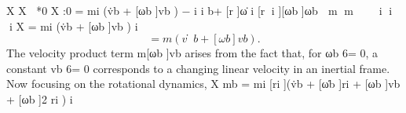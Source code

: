 \documentclass[12pt,a4paper]{article}
\begin{document}
                      X                               X        *0 X               :0
                  =         mi (v̇b + [ωb ]vb ) −          i i b+
                                                            [r ]ω̇     i [r
                                                                          i ][ωb ]ωb
                                                                                    
                                                          m          m
                                                                                
                                                                     
                        i                             i          i
                      X
                  =         mi (v̇b + [ωb ]vb )
                        i
\begin{equation}
= m(v̇b + [ωb ]vb ).
\label{eq:8.22}
\end{equation}
The velocity product term m[ωb ]vb arises from the fact that, for ωb 6= 0, a
constant vb 6= 0 corresponds to a changing linear velocity in an inertial frame.
   Now focusing on the rotational dynamics,
                       X
             mb =         mi [ri ](v̇b + [ω̇b ]ri + [ωb ]vb + [ωb ]2 ri )
                               i
\end{document}
